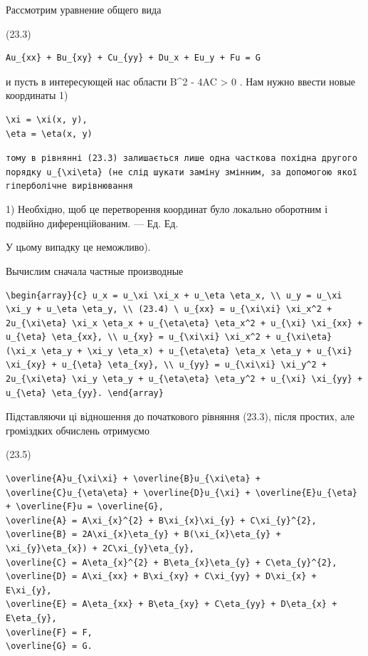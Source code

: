 \documentclass[
  ukrainian,
]{article}
\begin{document}
Рассмотрим уравнение общего вида

(23.3)

\begin{verbatim}
Au_{xx} + Bu_{xy} + Cu_{yy} + Du_x + Eu_y + Fu = G
\end{verbatim}

и пусть в интересующей нас области B\^{}2 - 4AC \textgreater{} 0 . Нам
нужно ввести новые координаты 1)

\begin{verbatim}
\xi = \xi(x, y),
\eta = \eta(x, y)
\end{verbatim}

\texttt{тому\ в\ рівнянні\ (23.3)\ залишається\ лише\ одна\ часткова\ похідна\ другого\ порядку\ \textquotesingle{}u\_\{\textbackslash{}xi\textbackslash{}eta\}\textquotesingle{}\ (не\ слід\ шукати\ заміну\ змінним,\ за\ допомогою\ якої\ гіперболічне\ вирівнювання}

1) Необхідно, щоб це перетворення координат було локально оборотним і
подвійно диференційованим. --- Ед. Ед.

У цьому випадку це неможливо).

Вычислим сначала частные производные

\begin{verbatim}
\begin{array}{c} u_x = u_\xi \xi_x + u_\eta \eta_x, \\ u_y = u_\xi \xi_y + u_\eta \eta_y, \\ (23.4) \ u_{xx} = u_{\xi\xi} \xi_x^2 + 2u_{\xi\eta} \xi_x \eta_x + u_{\eta\eta} \eta_x^2 + u_{\xi} \xi_{xx} + u_{\eta} \eta_{xx}, \\ u_{xy} = u_{\xi\xi} \xi_x^2 + u_{\xi\eta} (\xi_x \eta_y + \xi_y \eta_x) + u_{\eta\eta} \eta_x \eta_y + u_{\xi} \xi_{xy} + u_{\eta} \eta_{xy}, \\ u_{yy} = u_{\xi\xi} \xi_y^2 + 2u_{\xi\eta} \xi_y \eta_y + u_{\eta\eta} \eta_y^2 + u_{\xi} \xi_{yy} + u_{\eta} \eta_{yy}. \end{array}
\end{verbatim}

Підставляючи ці відношення до початкового рівняння (23.3), після
простих, але громіздких обчислень отримуємо

(23.5)

\begin{verbatim}
\overline{A}u_{\xi\xi} + \overline{B}u_{\xi\eta} + \overline{C}u_{\eta\eta} + \overline{D}u_{\xi} + \overline{E}u_{\eta} + \overline{F}u = \overline{G},
\overline{A} = A\xi_{x}^{2} + B\xi_{x}\xi_{y} + C\xi_{y}^{2},
\overline{B} = 2A\xi_{x}\eta_{y} + B(\xi_{x}\eta_{y} + \xi_{y}\eta_{x}) + 2C\xi_{y}\eta_{y},
\overline{C} = A\eta_{x}^{2} + B\eta_{x}\eta_{y} + C\eta_{y}^{2},
\overline{D} = A\xi_{xx} + B\xi_{xy} + C\xi_{yy} + D\xi_{x} + E\xi_{y},
\overline{E} = A\eta_{xx} + B\eta_{xy} + C\eta_{yy} + D\eta_{x} + E\eta_{y},
\overline{F} = F,
\overline{G} = G.
\end{verbatim}
\end{document}
